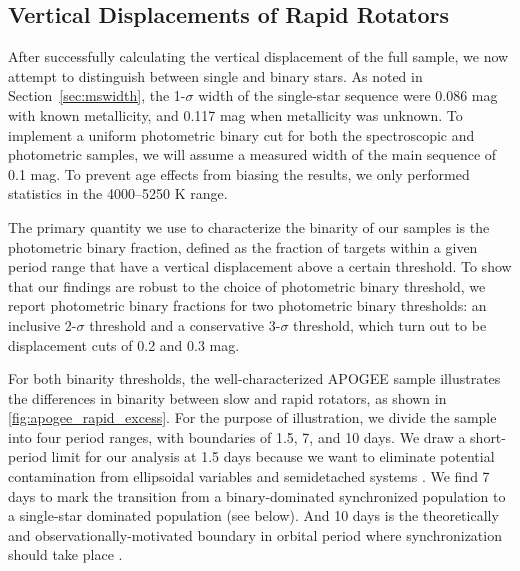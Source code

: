 \documentclass[twocolumn]{aastex6}
\begin{document}
\subsection{Vertical Displacements of Rapid Rotators}
\label{sec:elbadry}

After successfully calculating the vertical displacement of the full sample, we
now attempt to distinguish between single and binary stars. As noted in
Section~\ref{sec:mswidth}, the 1-\(\sigma\) width of the single-star sequence 
were 0.086 mag with known metallicity, and 0.117 mag when metallicity was unknown. 
To implement a uniform photometric binary cut for both the spectroscopic and
photometric samples, we will assume a measured width of the main sequence of 
0.1 mag. To prevent age effects 
from biasing the results, we only performed statistics in the 4000--5250 K 
range.

The primary quantity we use to characterize the binarity of our samples is the
photometric binary fraction, defined as the fraction of targets within a given
period range that have a vertical displacement above a certain threshold.
To show that our findings are robust to the choice of photometric
binary threshold, we report photometric binary fractions for two photometric 
binary thresholds: an inclusive 2-\(\sigma\) threshold and a conservative 
3-\(\sigma\) threshold, which turn out to be displacement cuts of 0.2 and 0.3 
mag. 

\begin{figure*}[htb]
    \centering
    \caption{\emph{Top Left to Bottom Right:} Vertical displacement of cool 
        APOGEE targets with \citet{McQuillan14} periods >10 days, between 
        7--10 days, 1.5--7 days, and <1.5 days. Pink stars denote 
        eclipsing binaries with orbital periods within the same ranges. The 
        green and purple lines denote the inclusive and conservative 
        photometric binary thresholds, respectively. The temperatures are from
    APOGEE.}\label{fig:apogee_rapid_excess}
\end{figure*}

For both binarity thresholds, the well-characterized APOGEE sample 
illustrates the differences in binarity between slow and rapid rotators, as
shown in \cref{fig:apogee_rapid_excess}. For
the purpose of illustration, we divide the sample into four period ranges, with
boundaries of 1.5, 7, and 10 days. We draw a short-period limit for our analysis 
at 1.5 days because we want to eliminate potential contamination from 
ellipsoidal variables and semidetached systems \citep{VanEylen16}. We find 7 
days to mark the transition from a binary-dominated synchronized population to 
a single-star dominated population (see below). And 10 days is the 
theoretically and observationally-motivated boundary in orbital period where 
synchronization should take place \citep{Claret97,Lurie17}.
\end{document}
